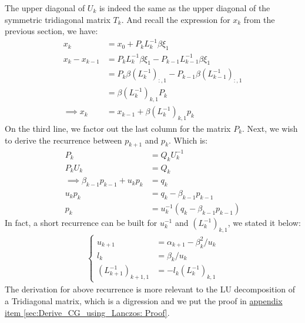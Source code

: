 \documentclass[]{article}
\theoremstyle{definition}
\begin{document}
            The upper diagonal of $U_k$ is indeed the same as the upper diagonal of the symmetric tridiagonal matrix $T_k$. And recall the expression for $x_k$ from the previous section, we have: 
            \begin{align}
                x_k &= x_0 + P_k L_k^{-1}\beta \xi_1 \\ 
                x_{k} - x_{k - 1} &= 
                P_k L_k^{-1} \beta \xi_1 - P_{k - 1}L^{-1}_{k - 1}\beta \xi_1
                \\
                &= P_k \beta(L^{-1}_k)_{:, 1} - P_{k - 1}\beta(L^{-1}_{k - 1})_{:, 1}
                \\
                &= \beta(L^{-1}_k)_{k, 1}P_k
                \\
                \implies x_k &= x_{k - 1} + \beta(L^{-1}_k)_{k, 1}p_k
            \end{align}
            On the third line, we factor out the last column for the matrix $P_k$. Next, we wish to derive the recurrence between $p_{k + 1}$ and $p_k$. Which is: 
            \begin{align}
                P_k &= Q_k U^{-1}_k
                \\
                P_kU_k &= Q_k
                \\\implies
                \beta_{k - 1}p_{k - 1} + u_k p_k &= q_k 
                \\
                u_k p_k &= q_k - \beta_{k - 1}p_{k - 1}
                \\
                p_k &= u^{-1}_k(q_k - \beta_{k - 1}p_{k - 1})
            \end{align}
            In fact, a short recurrence can be built for $u^{-1}_k$ and $(L_k^{-1})_{k ,1}$, we stated it below: 
            \begin{align}
                \begin{cases}
                    u_{k + 1} &= \alpha_{k + 1} - \beta_k^2/u_k
                    \\
                    l_k &= \beta_k/u_k
                    \\
                    (L^{-1}_{k + 1})_{k + 1, 1} 
                    &=
                    -l_k(L^{-1}_k)_{k, 1}
                \end{cases}
            \end{align}
            The derivation for above recurrence is more relevant to the LU decomposition of a Tridiagonal matrix, which is a digression and we put the proof in \hyperref[sec:Derive_CG_using_Lanczos: Proof]{appendix item \ref*{sec:Derive_CG_using_Lanczos: Proof}}. 
\end{document}

